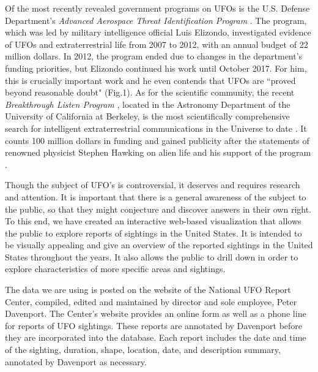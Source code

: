 \documentclass[journal]{vgtc}                %
\begin{document}
\indent Of the most recently revealed government programs on UFOs is the U.S. Defense Department's \textit{Advanced Aerospace Threat Identification Program} \cite{pentagon}. The program, which was led by military intelligence official Luis Elizondo, investigated evidence of UFOs and extraterrestrial life from 2007 to 2012, with an annual budget of 22 million dollars. In 2012, the program ended due to changes in the department's funding priorities, but Elizondo continued his work until October 2017. For him, this is crucially important work and he even contends that UFOs are ``proved beyond reasonable doubt" (Fig.1). As for the scientific community, the recent \textit{Breakthrough Listen Program} \cite{listen}, located in the Astronomy Department of the University of California at Berkeley, is the most scientifically comprehensive search for intelligent extraterrestrial communications in the Universe to date \cite{listenwiki}. It counts 100 million dollars in funding and gained publicity after the statements of renowned physicist Stephen Hawking on alien life and his support of the program \cite{hawking}.

Though the subject of UFO's is controversial, it deserves and requires research and attention. It is important that there is a general awareness of the subject to the public, so that they might conjecture and discover answers in their own right. To this end, we have created an interactive web-based visualization that allows the public to explore reports of sightings in the United States. It is intended to be visually appealing and give an overview of the reported sightings in the United States throughout the years. It also allows the public to drill down in order to explore characteristics of more specific areas and sightings.

The data we are using is posted on the website of the National UFO Report Center, compiled, edited and maintained by director and sole employee, Peter Davenport. The Center's website provides an online form as well as a phone line for reports of UFO sightings. These reports are annotated by Davenport before they are incorporated into the database. Each report includes the date and time of the sighting, duration, shape, location, date, and description summary, annotated by Davenport as necessary. 
\end{document}
